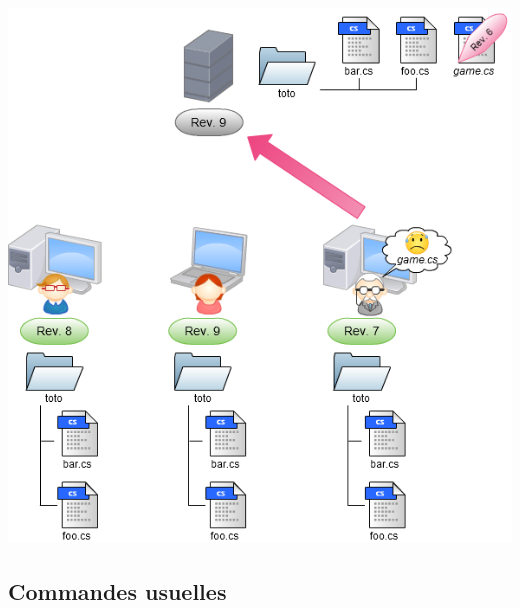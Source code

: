 \begin{frame}
  \begin{center}
    \includegraphics[scale=0.3]{images/16-Back1.png}
  \end{center}
\end{frame}


\subsection{Commandes usuelles}

